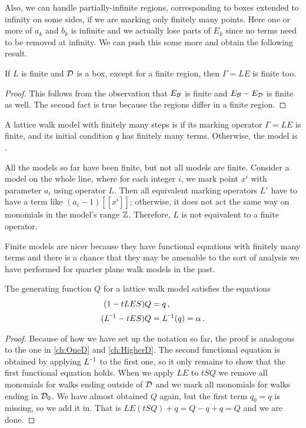 Also, we can handle partially-infinite regions, corresponding to boxes extended to infinity on some sides, if we are marking only finitely many points. Here one or more of $a_k$ and $b_k$ is infinite and we actually lose parts of $E_k$ since no terms need to be removed at infinity. We can push this some more and obtain the following result.

\begin{prop} If $L$ is finite and $\mathcal{D}$ is a box, except for a finite region, then $\Gamma = LE$ is finite too.
\end{prop}
\begin{proof} This follows from the observation that $E_{\mathcal{B}}$ is finite and $E_{\mathcal{B}} - E_{\mathcal{D}}$ is finite as well. The second fact is true because the regions differ in a finite region.
\end{proof}

\begin{defn} A lattice walk model with finitely many steps is  if its marking operator $\Gamma = LE$ is finite, and its initial condition $q$ has finitely many terms. Otherwise, the model is .
\end{defn}
\begin{exa}\label{ex:InfiniteOperator} All the models so far have been finite, but not all models are finite. Consider a \oneD model on the whole line, where for each integer $i$, we mark point $x^i$ with parameter $a_i$ using operator $L$. Then all equivalent marking operators $L'$ have to have a term like $(a_i-1)[[x^i]]$; otherwise, it does not act the same way on monomials in the model's range $\mathbb{Z}$. Therefore, $L$ is not equivalent to a finite operator.
\end{exa}
Finite models are nicer because they have functional equations with finitely many terms and there is a chance that they may be amenable to the sort of analysis we have performed for quarter plane walk models in the past.

\begin{thm} The generating function $Q$ for a lattice walk model satisfies the equations
\begin{align}
	(1-tLES)Q &= q\,,\\
	(L^{\um 1}-t ES)Q &= L^{\um 1}(q) = \alpha\,.
\end{align}
\end{thm}
\begin{proof} Because of how we have set up the notation so far, the proof is analogous to the one in \autoref{ch:OneD} and \autoref{ch:HigherD}. The second functional equation is obtained by applying $L^{\um 1}$ to the first one, so it only remains to show that the first functional equation holds. When we apply $LE$ to $tSQ$ we remove all monomials for walks ending outside of $\mathcal{D}$ and we mark all monomials for walks ending in $\mathcal{D}_0$. We have almost obtained $Q$ again, but the first term $q_0 = q$ is missing, so we add it in. That is $LE(tSQ)+q = Q - q + q = Q$ and we are done.
\end{proof}

